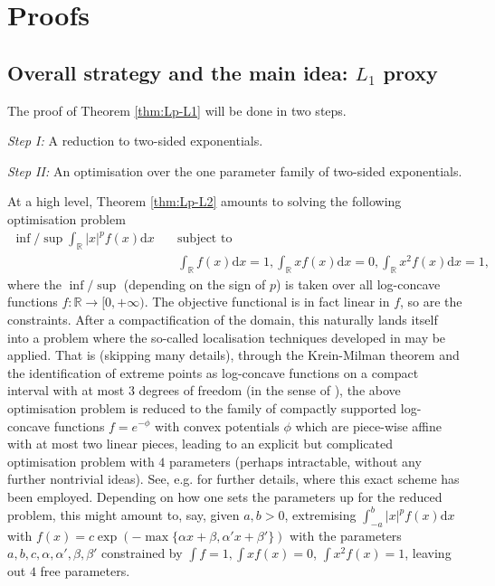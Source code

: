 \documentclass[10pt]{amsart}
\newcommand{\dd}{\mathrm{d}}
\newcommand{\1}{\textbf{1}}
\newcommand{\R}{\mathbb{R}}
\newcommand{\red}{}
\theoremstyle{remark}
\theoremstyle{definition}
\begin{document}
\section{Proofs}


\subsection{Overall strategy and the main idea: $L_1$ proxy}
The proof of Theorem \ref{thm:Lp-L1} will be done in two steps.

\emph{Step I:} A reduction to two-sided exponentials.

\emph{Step II:} An optimisation over the one parameter family of two-sided exponentials.

At a high level, Theorem \ref{thm:Lp-L2} amounts to solving the following optimisation problem
\begin{align*}
\inf\big/\sup \int_{\R} |x|^pf(x) \dd x &\quad \text{subject to}\\
 &\quad \int_{\R} f(x) \dd x = 1, \int_{\R} xf(x) \dd x = 0, \int_{\R} x^2 f(x) \dd x = 1,
 \end{align*}
where the $\inf\big/\sup$ (depending on the sign of $p$) is taken over all log-concave functions $f\colon \R \to [0,+\infty)$. The objective functional is in fact linear in $f$,
 so are the constraints. After a compactification of the domain, this naturally lands itself into a problem where the so-called localisation techniques developed
  in \cite{FG} may be applied. {\red That is (skipping many details), through the Krein-Milman theorem and the identification of extreme points as log-concave
   functions on a compact interval with at most $3$ degrees of freedom (in the sense of \cite{FG}), 
the above optimisation problem is reduced to the family of compactly supported log-concave functions $f = e^{-\phi}$ with convex potentials $\phi$
 which are piece-wise affine with at most two linear pieces, 
 leading to an explicit but complicated optimisation problem with $4$ parameters (perhaps intractable, without any further nontrivial ideas). See, e.g. \cite{BN, MNT, MNR, Mur} for further details, where this exact scheme has been employed.
 Depending on how one sets the parameters up for the reduced problem, this might amount to, say, given $a, b > 0$, 
 extremising $\int_{-a}^b |x|^pf(x) \dd x$ with $f(x) = c\exp(-\max\{\alpha x + \beta, \alpha' x + \beta'\})$ with the parameters $a, b, c, \alpha, \alpha', \beta, \beta'$
  constrained by $\int f = 1, \int xf(x) = 0$, $\int x^2f(x) = 1$, leaving out $4$ free parameters.}
\end{document}
